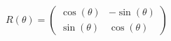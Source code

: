 \documentclass[crop]{standalone}
\begin{document}
    $ \displaystyle R(\theta) = \begin{pmatrix}
        \cos(\theta) & -\sin(\theta)\\
        \sin(\theta) & \cos(\theta)
    \end{pmatrix} $

        
\end{document}
